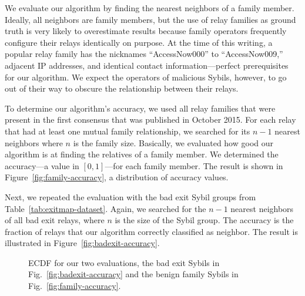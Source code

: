 We evaluate our algorithm by finding the nearest neighbors of a family member.
Ideally, all neighbors are family members, but the use of relay families as
ground truth is very likely to overestimate results because family operators
frequently configure their relays identically on purpose.  At the time of this
writing, a popular relay family has the nicknames ``AccessNow000'' to
``AccessNow009,'' adjacent IP addresses, and identical contact
information---perfect prerequisites for our algorithm.  We expect the operators
of malicious Sybils, however, to go out of their way to obscure the relationship
between their relays.

To determine our algorithm's accuracy, we used all relay families that were
present in the first consensus that was published in October 2015.  For each
relay that had at least one mutual family relationship, we searched for its $n -
1$ nearest neighbors where $n$ is the family size.  Basically, we evaluated how
good our algorithm is at finding the relatives of a family member.  We
determined the accuracy---a value in $[0,1]$---for each family member.  The
result is shown in Figure~\ref{fig:family-accuracy}, a distribution of accuracy
values.

Next, we repeated the evaluation with the bad exit Sybil groups from
Table~\ref{tab:exitmap-dataset}.  Again, we searched for the $n - 1$ nearest
neighbors of all bad exit relays, where $n$ is the size of the Sybil group.  The
accuracy is the fraction of relays that our algorithm correctly classified as
neighbor.  The result is illustrated in Figure~\ref{fig:badexit-accuracy}.

\begin{figure}
\centering
{}
\caption{ECDF for our two evaluations, the bad exit Sybils
	in Fig.~\ref{fig:badexit-accuracy} and the benign family Sybils
	in Fig.~\ref{fig:family-accuracy}.}
\label{fig:accuracy}
\end{figure}


